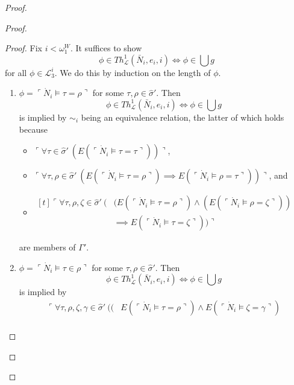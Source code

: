 \documentclass[12pt]{article}
\numberwithin{equation}{section}
\begin{document}
\begin{proof}
\begin{proof}
\begin{proof}
Fix $i < \omega_1^W$. It suffices to show 
\begin{equation*}
    \phi \in Th^{1}_{\mathcal{L}}(\bar{N}_i, e_i, i) \iff \phi \in \bigcup g
\end{equation*}
for all $\phi \in \mathcal{L}^i_3$. We do this by induction on the length of $\phi$. 

\begin{enumerate}[label=Case \arabic*:, leftmargin=50pt]
    \item $\phi = \ulcorner \dot{N}_i \models \tau = \rho \urcorner$ for some $\tau, \rho \in \hat{\sigma}'$. Then 
    \begin{equation*}
        \phi \in Th^{1}_{\mathcal{L}}(\bar{N}_i, e_i, i) \iff \phi \in \bigcup g
    \end{equation*}
    is implied by $\sim_i$ being an equivalence relation, the latter of which holds because 
    \begin{itemize}
        \item $\ulcorner \forall \tau \in \hat{\sigma}' \ (E(\ulcorner \dot{N}_i \models \tau = \tau \urcorner)) \urcorner$,
        \item $\ulcorner \forall \tau, \rho \in \hat{\sigma}' \ (E(\ulcorner \dot{N}_i \models \tau = \rho \urcorner) \implies E(\ulcorner \dot{N}_i \models \rho = \tau \urcorner)) \urcorner$, and
        \item 
        \!
        $\begin{aligned}[t]\ulcorner \forall \tau, \rho, \zeta \in \hat{\sigma}' \ (&(E(\ulcorner \dot{N}_i \models \tau = \rho \urcorner) \wedge (E(\ulcorner \dot{N}_i \models \rho = \zeta \urcorner)) \\
        & \implies E(\ulcorner \dot{N}_i \models \tau = \zeta \urcorner)) \urcorner
        \end{aligned}$
    \end{itemize}
    are members of $\Gamma'$.
    \item $\phi = \ulcorner \dot{N}_i \models \tau \in \rho \urcorner$ for some $\tau, \rho \in \hat{\sigma}'$. Then 
    \begin{equation*}
        \phi \in Th^{1}_{\mathcal{L}}(\bar{N}_i, e_i, i) \iff \phi \in \bigcup g
    \end{equation*}
    is implied by  
    \begin{align*}
        \ulcorner \forall \tau, \rho, \zeta, \gamma \in \hat{\sigma}' \ (( & E(\ulcorner \dot{N}_i \models \tau = \rho \urcorner) \wedge E(\ulcorner \dot{N}_i \models \zeta = \gamma \urcorner) \\

\end{align*}
\end{enumerate}
\end{proof}
\end{proof}
\end{proof}
\end{document}
